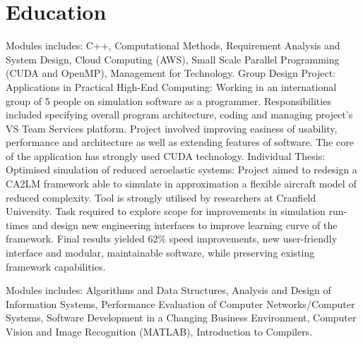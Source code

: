 \documentclass[12pt,english]{resume}
\begin{document}
	\section{Education}

			Modules includes: C++, Computational Methods, Requirement Analysis and System Design, Cloud Computing (AWS), Small Scale Parallel Programming (CUDA and OpenMP), Management for Technology.
			Group Design Project: Applications in Practical High-End Computing:
			Working in an international group of 5 people on simulation software as a programmer. Responsibilities included specifying overall program architecture, coding and managing project’s VS Team Services platform. Project involved improving easiness of usability, performance and architecture as well as extending features of software. The core of the application has strongly used CUDA technology.
			Individual Thesis: Optimised simulation of reduced aeroelastic systems:
			Project aimed to redesign a CA2LM framework able to simulate in approximation a flexible aircraft model of reduced complexity. Tool is strongly utilised by researchers at Cranfield University. Task required to explore scope for improvements in simulation run-times and design new engineering interfaces to improve learning curve of the framework. Final results yielded 62\% speed improvements, new user-friendly interface and modular, maintainable software, while preserving existing framework capabilities.

			Modules includes: Algorithms and Data Structures, Analysis and Design of Information Systems, Performance Evaluation of Computer Networks/Computer Systems, Software Development in a Changing Business Environment, Computer Vision and Image Recognition (MATLAB), Introduction to Compilers.
\end{document}
